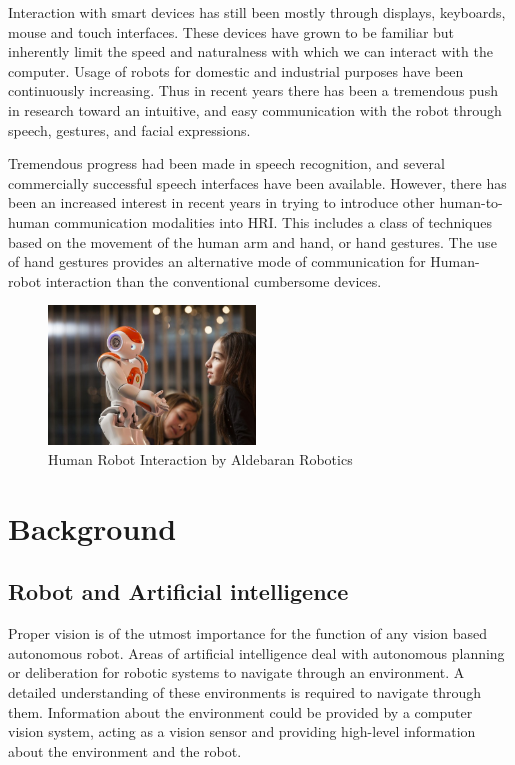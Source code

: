 Interaction with smart devices has still been mostly through displays, keyboards, mouse and touch interfaces. These devices have grown to be familiar but inherently limit the speed and naturalness with which we can interact with the computer.  Usage of robots for domestic and industrial purposes have been continuously increasing. Thus in recent years there has been a tremendous push in research toward an intuitive, and easy communication with the robot through speech, gestures, and facial expressions.

Tremendous progress had been made in speech recognition, and several commercially successful speech interfaces have been available. However, there has been an increased interest in recent years in trying to introduce other human-to-human communication modalities into HRI. This includes a class of techniques based on the movement of the human arm and hand, or hand gestures. The use of hand gestures provides an alternative mode of communication for Human-robot interaction than the conventional cumbersome devices.

\begin{figure}
	[h!] \centering 
	\includegraphics[width=5.5cm]{figures/nao-interaction.png} 
	\caption{Human Robot Interaction by Aldebaran Robotics} 
	\label{fig:nao:interaction} 
\end{figure}


\chapter{Background} 
\section{Robot and Artificial intelligence} Proper vision is of the utmost importance for the function of any vision based autonomous robot. Areas of artificial intelligence deal with autonomous planning or deliberation for robotic systems to navigate through an environment. A detailed understanding of these environments is required to navigate through them. Information about the environment could be provided by a computer vision system, acting as a vision sensor and providing high-level information about the environment and the robot.

